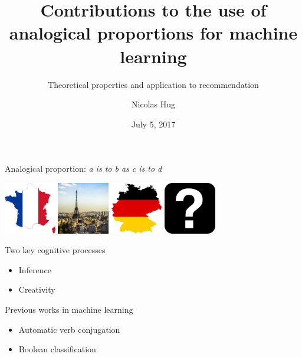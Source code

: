 \documentclass{beamer}
\title{Contributions to the use of analogical proportions for machine learning}
\subtitle{Theoretical properties and application to recommendation}
\date{July 5, 2017}
\author{Nicolas Hug}
\institute{Université Toulouse Paul Sabatier}
\begin{document}
\maketitle

\begin{frame}{Analogical proportion: \textit{a is to b as c is to d}}
  \begin{center}
  \includegraphics[width=0.17\textwidth]{figures/france.png}
  \includegraphics[width=0.17\textwidth]{figures/paris.jpg}
  \includegraphics[width=0.17\textwidth]{figures/germany.png}
  \includegraphics[width=0.17\textwidth]{figures/question-mark.jpg}
  \end{center}
  \begin{block}{Two key cognitive processes}
    \begin{itemize}
    \item Inference
    \item Creativity
    \end{itemize}
  \end{block}
  \begin{block}{Previous works in machine learning}
    \begin{itemize}
      \item Automatic verb conjugation \cite{StrYvoREPORT05}
      \item Boolean classification \cite{BayMicDelIJCAI07}
    \end{itemize}
  \end{block}
\end{frame}
\end{document}
